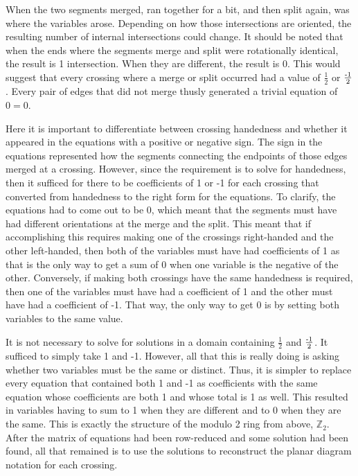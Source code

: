 \begin{paper}
{When the two segments merged, ran together for a bit, and then split again, was
where the variables arose.
Depending on how those intersections are oriented, the resulting number of
internal intersections could change.
It should be noted that when the ends where the segments merge and split were
rotationally identical, the result is 1 intersection.
When they are different, the result is 0.
This would suggest that every crossing where a merge or split occurred had a
value of $\frac12$ or $\frac{\text-1}2$.
Every pair of edges that did not merge thusly generated a trivial equation of
$0=0$.

Here it is important to differentiate between crossing handedness and whether it
appeared in the equations with a positive or negative sign.
The sign in the equations represented how the segments connecting the endpoints
of those edges merged at a crossing.
However, since the requirement is to solve for handedness, then it sufficed for
there to be coefficients of 1 or -1 for each crossing that converted from
handedness to the right form for the equations.
To clarify, the equations had to come out to be 0, which meant that the segments
must have had different orientations at the merge and the split.
This meant that if accomplishing this requires making one of the crossings
right-handed and the other left-handed, then both of the variables must have had
coefficients of 1 as that is the only way to get a sum of 0 when one variable
is the negative of the other.
Conversely, if making both crossings have the same handedness is required, then
one of the variables must have had a coefficient of 1 and the other must have
had a coefficient of -1.
That way, the only way to get 0 is by setting both variables to the same value.

It is not necessary to solve for solutions in a domain containing $\frac12$ and
$\frac{\text-1}2$.
It sufficed to simply take 1 and -1.
However, all that this is really doing is asking whether two variables must be
the same or distinct.
Thus, it is simpler to replace every equation that contained both 1 and -1 as
coefficients with the same equation whose coefficients are both 1 and whose
total is 1 as well.
This resulted in variables having to sum to 1 when they are different and to 0
when they are the same.
This is exactly the structure of the modulo 2 ring from above, $\mathbb{Z}_2$.
After the matrix of equations had been row-reduced and some solution had been
found, all that remained is to use the solutions to reconstruct the planar
diagram notation for each crossing.}


\end{paper}
